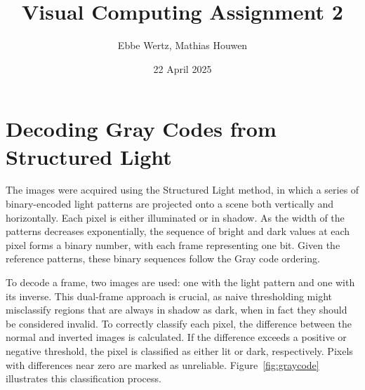 \documentclass{report}
\title{Visual Computing Assignment 2}
\author{Ebbe Wertz, Mathias Houwen}
\date{22 April 2025}
\begin{document}
\maketitle

\section{Decoding Gray Codes from Structured Light}
\label{sec:gray}

The images were acquired using the Structured Light method, in which a series of binary-encoded light patterns are projected onto a scene both vertically and horizontally. Each pixel is either illuminated or in shadow. As the width of the patterns decreases exponentially, the sequence of bright and dark values at each pixel forms a binary number, with each frame representing one bit. Given the reference patterns, these binary sequences follow the Gray code ordering.

To decode a frame, two images are used: one with the light pattern and one with its inverse. This dual-frame approach is crucial, as naive thresholding might misclassify regions that are always in shadow as dark, when in fact they should be considered invalid. To correctly classify each pixel, the difference between the normal and inverted images is calculated. If the difference exceeds a positive or negative threshold, the pixel is classified as either lit or dark, respectively. Pixels with differences near zero are marked as unreliable. Figure~\ref{fig:graycode} illustrates this classification process.
\end{document}
